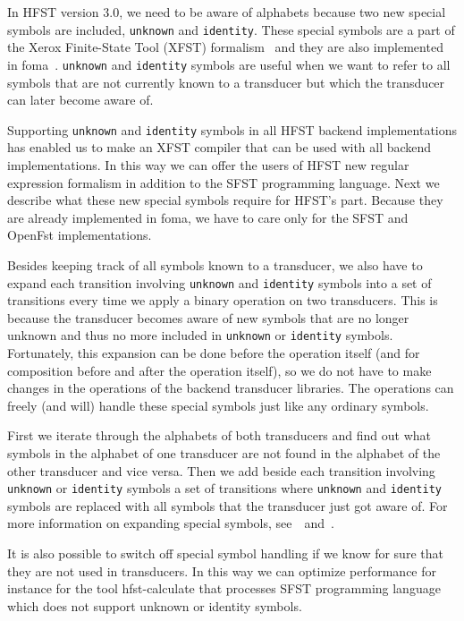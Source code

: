 \documentclass{llncs}
\begin{document}
In HFST version 3.0, we need to be aware of alphabets because two new
special symbols are included, \texttt{unknown} and \texttt{identity}. 
These special symbols are a part of the Xerox Finite-State Tool (XFST) 
formalism~\cite[page x]{beesley/2003} and they are also implemented in
foma~\cite{hulden/2009}. \texttt{unknown} and \texttt{identity} symbols 
are useful when we want to refer to all symbols that are not currently 
known to a transducer but which the transducer can later become aware of. 

Supporting \texttt{unknown} and \texttt{identity} symbols in all HFST backend
implementations has enabled us to make an XFST compiler that can be used
with all backend implementations. 
In this way we can offer the users of HFST new regular expression
formalism in addition to the SFST programming language. Next we
describe what these new special symbols require for HFST's
part. Because they are already implemented in foma, we have to care
only for the SFST and OpenFst implementations.

Besides keeping track of all symbols known to a transducer, we also
have to expand each transition involving \texttt{unknown} and 
\texttt{identity} symbols into a set of transitions every time we apply 
a binary operation on two transducers. 
This is because the transducer becomes aware of new symbols that are
no longer unknown and thus no more included in \texttt{unknown} or 
\texttt{identity} symbols.
Fortunately, this expansion can be done before the operation itself 
(and for composition before and after the operation itself), so we do
not have to make changes in the operations of the backend transducer
libraries. 
The operations can freely (and will) handle these special symbols just
like any ordinary symbols. 

First we iterate through the alphabets of both transducers and find
out what symbols in the alphabet of one transducer are not found in
the alphabet of the other transducer and vice versa. 
Then we add beside each transition involving \texttt{unknown} or 
\texttt{identity} symbols a set of transitions where \texttt{unknown} 
and \texttt{identity} symbols are
replaced with all symbols that the transducer just got aware of. 
For more information on expanding special symbols, 
see~\cite{hulden/2009}~and~\cite{beesley/2003}.

It is also possible to switch off special symbol handling if we know
for sure that they are not used in transducers. 
In this way we can optimize performance for instance for the tool 
hfst-calculate that processes SFST programming language which does not
support unknown or identity symbols.
\end{document}
